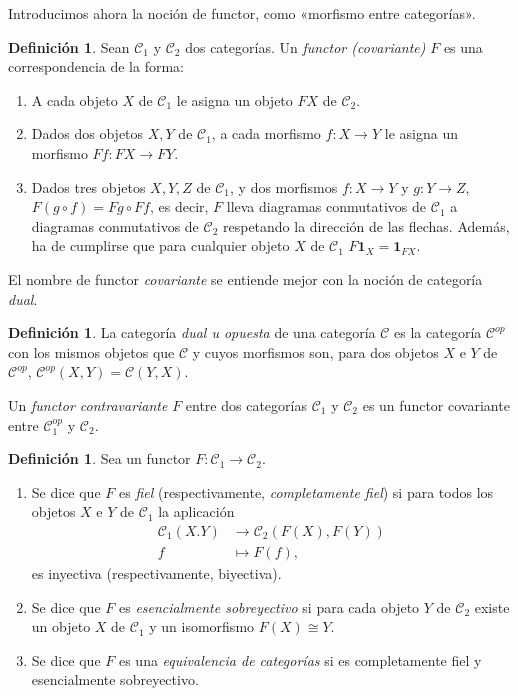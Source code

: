 \documentclass[12pt,a4paper]{article}
\theoremstyle{definition} \newtheorem{defn}[thm]{Definición}
\theoremstyle{definition} \newtheorem{ejemplo}[thm]{Ejemplo}
\theoremstyle{definition} \newtheorem{ejercicio}[thm]{Ejercicio}
\theoremstyle{remark} \newtheorem*{obs}{Observación}
\def\CC{\mathscr{C}}
\def\cat{\mathscr{C}}
\def\id{\mathbf{1}}
\begin{document}
Introducimos ahora la noción de functor, como «morfismo entre categorías».
\begin{defn}
  Sean $\cat_1$ y $\cat_2$ dos categorías. Un \emph{functor (covariante)} $F$ es una correspondencia de la forma:
  \begin{enumerate}
    \item A cada objeto $X$ de $\cat_1$ le asigna un objeto $FX$ de $\cat_2$.
    \item Dados dos objetos $X,Y$ de $\cat_1$, a cada morfismo $f:X\rightarrow Y$ le asigna un morfismo $Ff:FX\rightarrow FY$.
    \item Dados tres objetos $X,Y,Z$ de $\cat_1$, y dos morfismos $f:X\rightarrow Y$ y $g:Y\rightarrow Z$, $F(g\circ f)=Fg \circ Ff$, es decir, $F$ lleva diagramas conmutativos de $\cat_1$ a diagramas conmutativos de $\cat_2$ respetando la dirección de las flechas. Además, ha de cumplirse que para cualquier objeto $X$ de $\cat_1$ $F\id_X=\id_{FX}$.
  \end{enumerate}
\end{defn}

El nombre de functor \emph{covariante} se entiende mejor con la noción de categoría \emph{dual}.

\begin{defn}
  La categoría \emph{dual u opuesta} de una categoría $\CC$ es la categoría $\CC^{op}$ con los mismos objetos que $\CC$ y cuyos morfismos son, para dos objetos $X$ e $Y$ de $\CC^{op}$, $\CC^{op}(X,Y)=\CC(Y,X)$.

  Un \emph{functor contravariante} $F$ entre dos categorías $\CC_1$ y $\CC_2$ es un functor covariante entre $\CC_1^{op}$ y $\CC_2$.
\end{defn}

\begin{defn}
  Sea un functor $F:\CC_1 \rightarrow \CC_2$. 
  \begin{enumerate}
\item Se dice que $F$ es \emph{fiel} (respectivamente, \emph{completamente fiel}) si para todos los objetos $X$ e $Y$ de $\CC_1$ la aplicación 
  \begin{align*}
     \CC_1(X.Y)&\longrightarrow \CC_2(F(X),F(Y))\\ 
      f &\longmapsto F(f),
    \end{align*}
    es inyectiva (respectivamente, biyectiva). 

  \item Se dice que $F$ es \emph{esencialmente sobreyectivo} si para cada objeto $Y$ de $\CC_2$ existe un objeto $X$ de $\CC_1$ y un isomorfismo $F(X)\cong Y$.

  \item Se dice que $F$ es una \emph{equivalencia de categorías} si es completamente fiel y esencialmente sobreyectivo.
\end{enumerate}
\end{defn}
\end{document}
